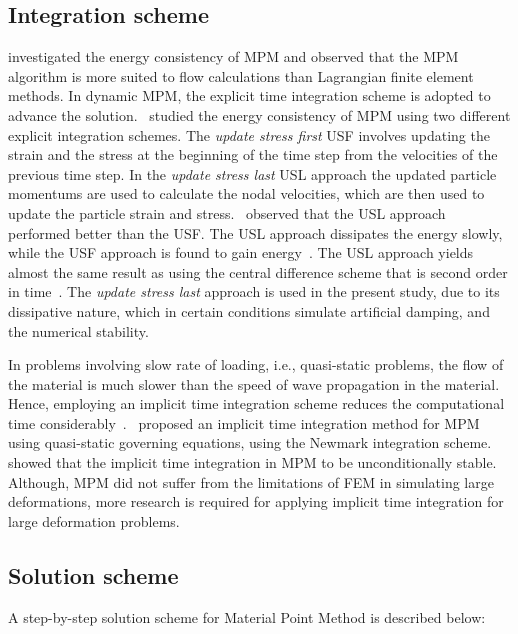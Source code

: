 \subsection{Integration scheme}

\citet{Love2006} investigated the energy consistency of MPM and observed that 
the MPM algorithm is more suited to flow calculations than Lagrangian finite 
element methods. In dynamic MPM, the explicit time integration scheme is 
adopted to advance the solution.~\citet{Bardenhagen2002} studied the energy 
consistency of MPM using two 
different explicit integration schemes. The \textit{update stress first} USF
involves updating the strain and the stress at the beginning of the time step 
from the velocities of the previous time step. In the \textit{update stress 
last} USL approach the updated particle momentums are used to calculate the 
nodal velocities, which are then used to update the particle strain and 
stress.~\citet{Bardenhagen2002} observed that the USL approach performed better 
than the USF. The USL approach dissipates the energy slowly, while the USF 
approach is found to gain energy~\citep{Kafaji2013}. The USL approach yields 
almost the same result as using the central difference scheme that is second 
order in time~\citep{Wallstedt2008}. The \textit{update stress last} approach 
is used in the present study, due to its dissipative nature, which in certain 
conditions simulate artificial damping, and the numerical stability.

In problems involving slow rate of loading, i.e., quasi-static problems, the 
flow of the material is much slower than the speed of wave propagation in the 
material. Hence, employing an implicit time integration scheme reduces the 
computational time considerably~\citep{Kafaji2013}.~\citet{Guilkey2003a} 
proposed an implicit time integration method for MPM using quasi-static 
governing equations, using the Newmark integration scheme.~\citet{Love2006} 
showed that the implicit time integration in MPM to be unconditionally stable. 
Although, MPM did not suffer from the limitations of FEM in simulating large 
deformations, more research is required for applying implicit time integration 
for large deformation problems. 

\subsection{Solution scheme}
A step-by-step solution scheme for Material Point Method is described below:

